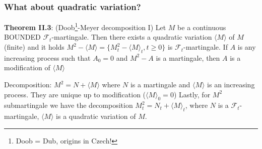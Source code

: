 \documentclass[english]{article}
\newcommand{\note}[1]{\noindent\textbf{#1}}
\newcommand{\F}{\mathcal F}
\begin{document}
\subsubsection*{What about quadratic variation?}
\note{Theorem II.3}: (Doob\footnote{Doob = Dub, origins in Czech!}-Meyer decomposition I) Let $M$ be a continuous BOUNDED $\F_t$-martingale. Then there exists a quadratic variation $\langle M \rangle$ of $M$ (finite) and it holds $M^2 - \langle M \rangle = \{M^2_t - \langle M \rangle_t, t\geq 0\}$ is $\F_t$-martingale. \newline
If $A$ is any increasing process such that $A_0=0$ and $M^2-A$ is a martingale, then $A$ is a modification of $\langle M \rangle$

Decomposition: $M^2 = N + \langle M \rangle$ where $N$ is a martingale and $\langle M \rangle$ is an increasing process. They are unique up to modification ($\langle M \rangle_0 = 0$) \newline
Lastly, for $M^2$ submartingale we have the decomposition $M^2_t = N_t + \langle M\rangle_t$, where $N$ is a $\F_t$-martingale, $\langle M \rangle$ is a quadratic variation of $M$.
\end{document}
